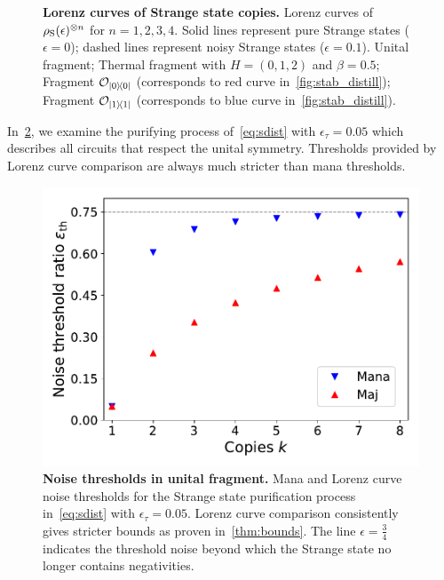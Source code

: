 \documentclass[pra,
aps,
twocolumn,
superscriptaddress,
groupedaddress,
nofootinbib,
reprint
]{revtex4-1}
\begin{document}
\begin{figure}
{    %
    }
    \caption{\textbf{Lorenz curves of Strange state copies.} Lorenz curves of $\rho_{\rm{S}}(\epsilon)^{\otimes n}$ for $n=1,2,3,4$.
    Solid lines represent pure Strange states ($\epsilon = 0$); dashed lines represent noisy Strange states ($\epsilon = 0.1$).
     Unital fragment;  Thermal fragment with $H = (0,1,2)$ and $\beta = 0.5$;  Fragment $\mathcal{O}_{\ketbra{0}{0}}$ (corresponds to red curve in~\cref{fig:stab_distill});  Fragment $\mathcal{O}_{\ketbra{1}{1}}$ (corresponds to blue curve in~\cref{fig:stab_distill}). 
    }%
    \label{fig:lcs}
\end{figure}

In~\cref{fig:unital_distill}, we examine the purifying process of~\cref{eq:sdist} with $\epsilon_\tau = 0.05$ which describes all circuits that respect the unital symmetry.
Thresholds provided by Lorenz curve comparison are always much stricter than mana thresholds.
\begin{figure}
    \centering
    \includegraphics[scale=0.5]{figs/unital_distill.pdf}
    \caption{\textbf{Noise thresholds in unital fragment.} Mana and Lorenz curve noise thresholds for the Strange state purification process in~\cref{eq:sdist} with $\epsilon_\tau = 0.05$.
    Lorenz curve comparison consistently gives stricter bounds as proven in~\cref{thm:bounds}.
    The line $\epsilon = \frac{3}{4}$ indicates the threshold noise beyond which the Strange state no longer contains negativities.
    }
    \label{fig:unital_distill}
\end{figure}
\end{document}
